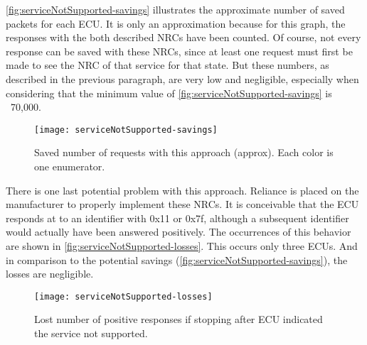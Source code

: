 \autoref{fig:serviceNotSupported-savings} illustrates the approximate number of saved packets for each ECU. It is only an approximation because for this graph, the responses with the both described NRCs have been counted. Of course, not every response can be saved with these NRCs, since at least one request must first be made to see the NRC of that service for that state. But these numbers, as described in the previous paragraph, are very low and negligible, especially when considering that the minimum value of \autoref{fig:serviceNotSupported-savings} is ~70,000.

\begin{figure}[h]
    \centering
    \texttt{[image: serviceNotSupported-savings]}
    \caption{Saved number of requests with this approach (approx). Each color is one enumerator.}
    \label{fig:serviceNotSupported-savings}
\end{figure}

There is one last potential problem with this approach. Reliance is placed on the manufacturer to properly implement these NRCs. It is conceivable that the ECU responds at to an identifier with 0x11 or 0x7f, although a subsequent identifier would actually have been answered positively. The occurrences of this behavior are shown in \autoref{fig:serviceNotSupported-losses}. This occurs only three ECUs.
And in comparison to the potential savings (\autoref{fig:serviceNotSupported-savings}), the losses are negligible.

\begin{figure}[h]
    \centering
    \texttt{[image: serviceNotSupported-losses]}
    \caption{Lost number of positive responses if stopping after ECU indicated the service not supported.}
    \label{fig:serviceNotSupported-losses}
\end{figure}
